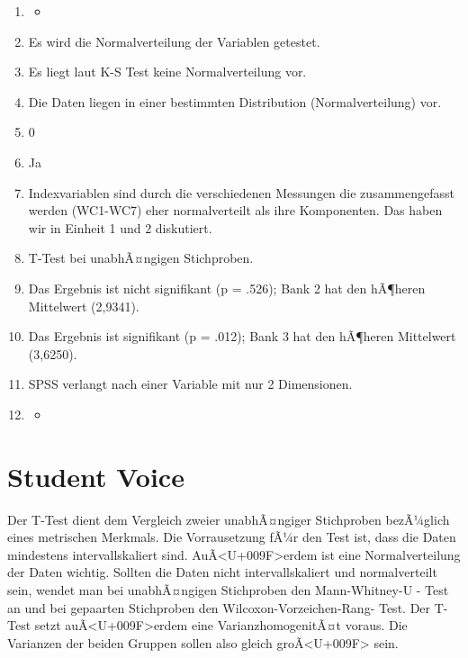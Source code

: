 \documentclass[
]{book}
\begin{document}
\begin{enumerate}
\def\labelenumi{\arabic{enumi}.}
\item
  \begin{itemize}
  \item
  \end{itemize}
\item
  Es wird die Normalverteilung der Variablen getestet.
\item
  Es liegt laut K-S Test keine Normalverteilung vor.
\item
  Die Daten liegen in einer bestimmten Distribution (Normalverteilung) vor.
\item
  0
\item
  Ja
\item
  Indexvariablen sind durch die verschiedenen Messungen die zusammengefasst werden (WC1-WC7) eher normalverteilt als ihre Komponenten. Das haben wir in Einheit 1 und 2 diskutiert.
\item
  T-Test bei unabhÃ¤ngigen Stichproben.
\item
  Das Ergebnis ist nicht signifikant (p = .526); Bank 2 hat den hÃ¶heren Mittelwert (2,9341).
\item
  Das Ergebnis ist signifikant (p = .012); Bank 3 hat den hÃ¶heren Mittelwert (3,6250).
\item
  SPSS verlangt nach einer Variable mit nur 2 Dimensionen.
\item
  \begin{itemize}
  \item
  \end{itemize}
\end{enumerate}

\hypertarget{student-voice}{%
\section{Student Voice}\label{student-voice}}

Der T-Test dient dem Vergleich zweier unabhÃ¤ngiger Stichproben bezÃ¼glich eines metrischen Merkmals. Die Vorrausetzung fÃ¼r den Test ist, dass die Daten mindestens intervallskaliert sind. AuÃ\textless U+009F\textgreater erdem ist eine Normalverteilung der Daten wichtig.
Sollten die Daten nicht intervallskaliert und normalverteilt sein, wendet man bei unabhÃ¤ngigen Stichproben den Mann-Whitney-U - Test an und bei gepaarten Stichproben den Wilcoxon-Vorzeichen-Rang- Test.
Der T-Test setzt auÃ\textless U+009F\textgreater erdem eine VarianzhomogenitÃ¤t voraus. Die Varianzen der beiden Gruppen sollen also gleich groÃ\textless U+009F\textgreater{} sein.
\end{document}
